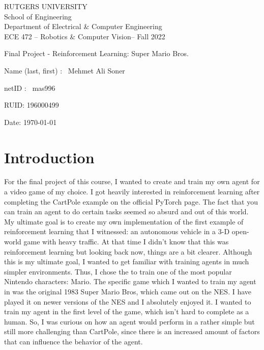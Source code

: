 \documentclass{article}
\numberwithin{equation}{section}
\numberwithin{equation}{section}
\def\ce{\begin{center}}
\def\cend{\end{center}}
\def\red{\color{red}}
\def\blue{\color{blue}}
\begin{document}
\ce
\red\Large
RUTGERS UNIVERSITY \\[0.05in]
School of Engineering \\[0.05in]
Department of Electrical \& Computer Engineering \\[0.2in]
\blue ECE 472 -- Robotics \& Computer Vision-- Fall 2022
\cend

\vspace{1in}

\huge \blue 

\begin{center}
Final Project - Reinforcement Learning: Super Mario Bros.
\end{center}

\vspace{1in}

\Large

Name (last, first) : \ Mehmet Ali Soner 

\vspace{0.3in}

netID : \ mas996

\vspace{0.3in}

RUID:  196000499

\vspace{0.3in}

Date: \today




\vspace{1in}

\color{black} \normalsize


\newpage




\section*{Introduction}
For the final project of this course, I wanted to create and train my own agent for a video game of my choice. I got heavily interested in reinforcement learning after completing the CartPole example on the official PyTorch page. The fact that you can train an agent to do certain tasks seemed so absurd and out of this world. My ultimate goal is to create my own implementation of the first example of reinforcement learning that I witnessed: an autonomous vehicle in a 3-D open-world game with heavy traffic. At that time I didn't know that this was reinforcement learning but looking back now, things are a bit clearer. Although this is my ultimate goal, I wanted to get familiar with training agents in much simpler environments. Thus, I chose the to train one of the most popular Nintendo characters: Mario. The specific game which I wanted to train my agent in was the original 1983 Super Mario Bros, which came out on the NES. I have played it on newer versions of the NES and I absolutely enjoyed it. I wanted to train my agent in the first level of the game, which isn't hard to complete as a human. So, I was curious on how an agent would perform in a rather simple but still more challenging than CartPole, since there is an increased amount of factors that can influence the behavior of the agent. 
\end{document}
